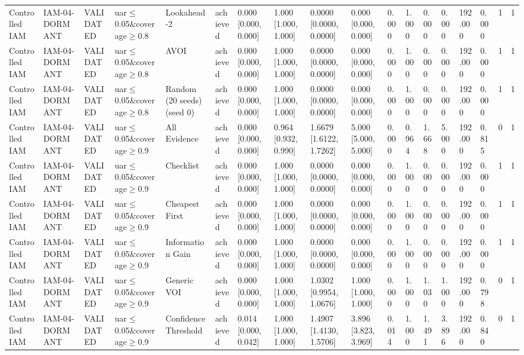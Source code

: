 \begin{table}[!ht]
{\begin{tabular}{llllllllllllllllll}
Controlled IAM & IAM-04-DORMANT & VALIDATED & uar$\le$0.05\&coverage$\ge$0.8 & Lookahead-2 & achieved & 0.000 [0.000, 0.000] & 1.000 [1.000, 1.000] & 0.0000 [0.0000, 0.0000] & 0.000 [0.000, 0.000] & 0.000 & 1.000 & 0.000 & 0.000 & 192.000 & 0.000 & 1 & 1 \\
Controlled IAM & IAM-04-DORMANT & VALIDATED & uar$\le$0.05\&coverage$\ge$0.8 & AVOI & achieved & 0.000 [0.000, 0.000] & 1.000 [1.000, 1.000] & 0.0000 [0.0000, 0.0000] & 0.000 [0.000, 0.000] & 0.000 & 1.000 & 0.000 & 0.000 & 192.000 & 0.000 & 1 & 1 \\
Controlled IAM & IAM-04-DORMANT & VALIDATED & uar$\le$0.05\&coverage$\ge$0.8 & Random (20 seeds) (seed 0) & achieved & 0.000 [0.000, 0.000] & 1.000 [1.000, 1.000] & 0.0000 [0.0000, 0.0000] & 0.000 [0.000, 0.000] & 0.000 & 1.000 & 0.000 & 0.000 & 192.000 & 0.000 & 1 & 1 \\
Controlled IAM & IAM-04-DORMANT & VALIDATED & uar$\le$0.05\&coverage$\ge$0.9 & All Evidence & achieved & 0.000 [0.000, 0.000] & 0.964 [0.932, 0.990] & 1.6679 [1.6122, 1.7262] & 5.000 [5.000, 5.000] & 0.000 & 0.964 & 1.668 & 5.000 & 192.000 & 0.815 & 0 & 1 \\
Controlled IAM & IAM-04-DORMANT & VALIDATED & uar$\le$0.05\&coverage$\ge$0.9 & Checklist & achieved & 0.000 [0.000, 0.000] & 1.000 [1.000, 1.000] & 0.0000 [0.0000, 0.0000] & 0.000 [0.000, 0.000] & 0.000 & 1.000 & 0.000 & 0.000 & 192.000 & 0.000 & 1 & 1 \\
Controlled IAM & IAM-04-DORMANT & VALIDATED & uar$\le$0.05\&coverage$\ge$0.9 & Cheapest First & achieved & 0.000 [0.000, 0.000] & 1.000 [1.000, 1.000] & 0.0000 [0.0000, 0.0000] & 0.000 [0.000, 0.000] & 0.000 & 1.000 & 0.000 & 0.000 & 192.000 & 0.000 & 1 & 1 \\
Controlled IAM & IAM-04-DORMANT & VALIDATED & uar$\le$0.05\&coverage$\ge$0.9 & Information Gain & achieved & 0.000 [0.000, 0.000] & 1.000 [1.000, 1.000] & 0.0000 [0.0000, 0.0000] & 0.000 [0.000, 0.000] & 0.000 & 1.000 & 0.000 & 0.000 & 192.000 & 0.000 & 1 & 1 \\
Controlled IAM & IAM-04-DORMANT & VALIDATED & uar$\le$0.05\&coverage$\ge$0.9 & Generic VOI & achieved & 0.000 [0.000, 0.000] & 1.000 [1.000, 1.000] & 1.0302 [0.9954, 1.0676] & 1.000 [1.000, 1.000] & 0.000 & 1.000 & 1.030 & 1.000 & 192.000 & 0.798 & 0 & 1 \\
Controlled IAM & IAM-04-DORMANT & VALIDATED & uar$\le$0.05\&coverage$\ge$0.9 & Confidence Threshold & achieved & 0.014 [0.000, 0.042] & 1.000 [1.000, 1.000] & 1.4907 [1.4130, 1.5706] & 3.896 [3.823, 3.969] & 0.014 & 1.000 & 1.491 & 3.896 & 192.000 & 0.840 & 0 & 1 \\

\end{tabular}}
\end{table}
